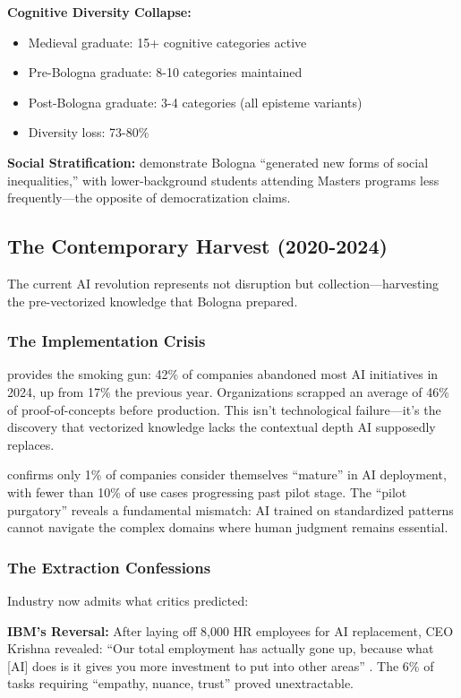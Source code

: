 \textbf{Cognitive Diversity Collapse:}
\begin{itemize}
\item Medieval graduate: 15+ cognitive categories active
\item Pre-Bologna graduate: 8-10 categories maintained
\item Post-Bologna graduate: 3-4 categories (all episteme variants)
\item Diversity loss: 73-80\%
\end{itemize}

\textbf{Social Stratification:} \citet{kroher2021} demonstrate Bologna ``generated new forms of social inequalities,'' with lower-background students attending Masters programs less frequently---the opposite of democratization claims.

\subsection{The Contemporary Harvest (2020-2024)}

The current AI revolution represents not disruption but collection---harvesting the pre-vectorized knowledge that Bologna prepared.

\subsubsection{The Implementation Crisis}

\citet{spglobal2025} provides the smoking gun: 42\% of companies abandoned most AI initiatives in 2024, up from 17\% the previous year. Organizations scrapped an average of 46\% of proof-of-concepts before production. This isn't technological failure---it's the discovery that vectorized knowledge lacks the contextual depth AI supposedly replaces.

\citet{mckinsey2025} confirms only 1\% of companies consider themselves ``mature'' in AI deployment, with fewer than 10\% of use cases progressing past pilot stage. The ``pilot purgatory'' reveals a fundamental mismatch: AI trained on standardized patterns cannot navigate the complex domains where human judgment remains essential.

\subsubsection{The Extraction Confessions}

Industry now admits what critics predicted:

\textbf{IBM's Reversal:} After laying off 8,000 HR employees for AI replacement, CEO Krishna revealed: ``Our total employment has actually gone up, because what [AI] does is it gives you more investment to put into other areas'' \citep{krishna2024}. The 6\% of tasks requiring ``empathy, nuance, trust'' proved unextractable.

